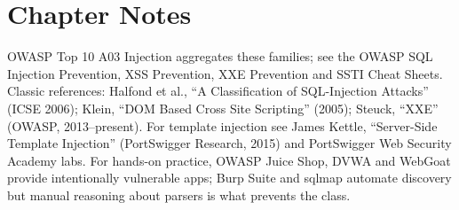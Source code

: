 \section*{Chapter Notes}
OWASP Top 10 A03 Injection aggregates these families; see the OWASP SQL Injection Prevention, XSS Prevention, XXE Prevention and SSTI Cheat Sheets. Classic references: Halfond et al., ``A Classification of SQL-Injection Attacks'' (ICSE 2006); Klein, ``DOM Based Cross Site Scripting'' (2005); Steuck, ``XXE'' (OWASP, 2013--present). For template injection see James Kettle, ``Server-Side Template Injection'' (PortSwigger Research, 2015) and PortSwigger Web Security Academy labs. For hands-on practice, OWASP Juice Shop, DVWA and WebGoat provide intentionally vulnerable apps; Burp Suite and sqlmap automate discovery but manual reasoning about parsers is what prevents the class.
